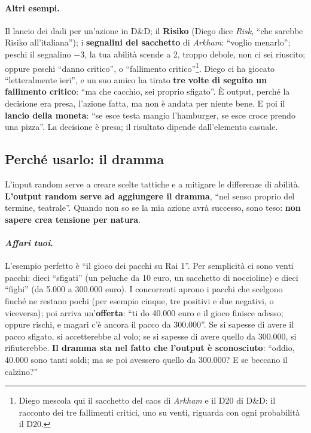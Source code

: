 \paragraph{Altri esempi.} Il lancio dei dadi per un'azione in D\&D; il \textbf{Risiko} (Diego
dice \emph{Risk}, ``che sarebbe Risiko all'italiana''); i \textbf{segnalini del sacchetto} di
\emph{Arkham}: ``voglio menarlo''; peschi il segnalino $-3$, la tua abilità scende a 2, troppo
debole, non ci sei riuscito; oppure peschi ``danno critico'', o ``fallimento
critico''\footnote{Diego mescola qui il sacchetto del caos di \emph{Arkham} e il D20 di D\&D:
il racconto dei tre fallimenti critici, uno su venti, riguarda con ogni probabilità il D20.}.
Diego ci ha giocato ``letteralmente ieri'', e un suo amico ha tirato \textbf{tre volte di
seguito un fallimento critico}: ``ma che cacchio, sei proprio sfigato''. È output, perché la
decisione era presa, l'azione fatta, ma non è andata per niente bene. E poi il \textbf{lancio
della moneta}: ``se esce testa mangio l'hamburger, se esce croce prendo una pizza''. La
decisione è presa; il risultato dipende dall'elemento casuale.

\subsection{Perché usarlo: il dramma}

L'input random serve a creare scelte tattiche e a mitigare le differenze di abilità.
\textbf{L'output random serve ad aggiungere il dramma}, ``nel senso proprio del termine,
teatrale''. Quando non so se la mia azione avrà successo, sono teso: \textbf{non sapere crea
tensione per natura}.

\paragraph{\emph{Affari tuoi}.} L'esempio perfetto è ``il gioco dei pacchi su Rai 1''. Per
semplicità ci sono venti pacchi: dieci ``sfigati'' (un peluche da 10 euro, un sacchetto di
noccioline) e dieci ``fighi'' (da 5.000 a 300.000 euro). I concorrenti aprono i pacchi che
scelgono finché ne restano pochi (per esempio cinque, tre positivi e due negativi, o
viceversa); poi arriva un'\textbf{offerta}: ``ti do 40.000 euro e il gioco finisce adesso;
oppure rischi, e magari c'è ancora il pacco da 300.000''. Se si sapesse di avere il pacco
sfigato, si accetterebbe al volo; se si sapesse di avere quello da 300.000, si rifiuterebbe.
\textbf{Il dramma sta nel fatto che l'output è sconosciuto}: ``oddio, 40.000 sono tanti
soldi; ma se poi avessero quello da 300.000? E se beccano il calzino?''


